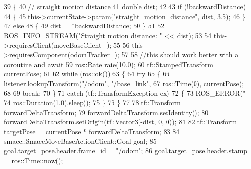\begin{DoxyCode}
39     \{
40         \textcolor{comment}{// straight motion distance}
41         \textcolor{keywordtype}{double} dist;
42 
43         \textcolor{keywordflow}{if} (!\hyperlink{classSbNavigateBackwards_ad7e0e6b09dae085c1106335e208d6e84}{backwardDistance})
44         \{
45             this->\hyperlink{classsmacc_1_1SmaccSubStateBehavior_a62e2b9da4a446f09396d0b4c01659b88}{currentState}->\hyperlink{classsmacc_1_1ISmaccState_a4982f2187ed6da337462721146e8ef70}{param}(\textcolor{stringliteral}{"straight\_motion\_distance"}, dist, 3.5);
46         \}
47         \textcolor{keywordflow}{else}
48         \{
49             dist = *\hyperlink{classSbNavigateBackwards_ad7e0e6b09dae085c1106335e208d6e84}{backwardDistance};
50         \}
51 
52         ROS\_INFO\_STREAM(\textcolor{stringliteral}{"Straight motion distance: "} << dist);
53 
54         this->\hyperlink{classsmacc_1_1SmaccSubStateBehavior_ae8361a9e794b02f9f3d962b881e4fd7d}{requiresClient}(\hyperlink{classSbNavigateBackwards_a7e46b20eb07e60685a5b88b12b341fd8}{moveBaseClient\_});
55         
56         this->\hyperlink{classsmacc_1_1SmaccSubStateBehavior_a9f31f62f886cc06017e92fa0d834b12d}{requiresComponent}(\hyperlink{classSbNavigateBackwards_a570fa48348a172b3db7bcb5f486017b1}{odomTracker\_});
57 
58         \textcolor{comment}{//this should work better with a coroutine and await}
59         ros::Rate rate(10.0);
60         tf::StampedTransform currentPose;
61 
62         \textcolor{keywordflow}{while} (ros::ok())
63         \{
64             \textcolor{keywordflow}{try}
65             \{
66                 \hyperlink{classSbNavigateBackwards_a23f881d6f742d683a2f6b671c21688cc}{listener}.lookupTransform(\textcolor{stringliteral}{"/odom"}, \textcolor{stringliteral}{"/base\_link"}, 
67                                          ros::Time(0), currentPose);
68 
69                 \textcolor{keywordflow}{break};
70             \}
71             \textcolor{keywordflow}{catch} (tf::TransformException ex)
72             \{
73                 ROS\_ERROR(\textcolor{stringliteral}{"%
74                 ros::Duration(1.0).sleep();
75             \}
76         \}
77 
78         tf::Transform forwardDeltaTransform;
79         forwardDeltaTransform.setIdentity();
80         forwardDeltaTransform.setOrigin(tf::Vector3(-dist, 0, 0));
81 
82         tf::Transform targetPose = currentPose * forwardDeltaTransform;
83 
84         smacc::SmaccMoveBaseActionClient::Goal goal;
85         goal.target\_pose.header.frame\_id = \textcolor{stringliteral}{"/odom"};
86         goal.target\_pose.header.stamp = ros::Time::now();
}
\end{DoxyCode}
